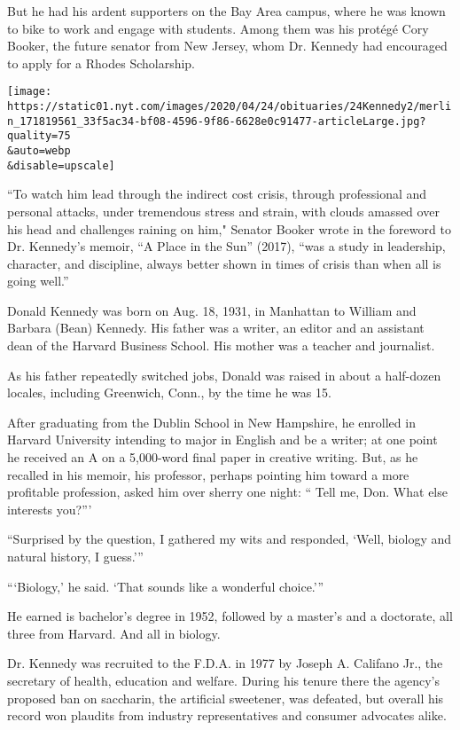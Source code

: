 But he had his ardent supporters on the Bay Area campus, where he was
known to bike to work and engage with students. Among them was his
protégé Cory Booker, the future senator from New Jersey, whom Dr.
Kennedy had encouraged to apply for a Rhodes Scholarship.

\texttt{[image: https://static01.nyt.com/images/2020/04/24/obituaries/24Kennedy2/merlin\_171819561\_33f5ac34-bf08-4596-9f86-6628e0c91477-articleLarge.jpg?quality=75\\\&auto=webp\\\&disable=upscale]}

``To watch him lead through the indirect cost crisis, through
professional and personal attacks, under tremendous stress and strain,
with clouds amassed over his head and challenges raining on him,"
Senator Booker wrote in the foreword to Dr. Kennedy's memoir, ``A Place
in the Sun'' (2017), ``was a study in leadership, character, and
discipline, always better shown in times of crisis than when all is
going well.''

Donald Kennedy was born on Aug. 18, 1931, in Manhattan to William and
Barbara (Bean) Kennedy. His father was a writer, an editor and an
assistant dean of the Harvard Business School. His mother was a teacher
and journalist.

As his father repeatedly switched jobs, Donald was raised in about a
half-dozen locales, including Greenwich, Conn., by the time he was 15.

After graduating from the Dublin School in New Hampshire, he enrolled in
Harvard University intending to major in English and be a writer; at one
point he received an A on a 5,000-word final paper in creative writing.
But, as he recalled in his memoir, his professor, perhaps pointing him
toward a more profitable profession, asked him over sherry one night: ``
Tell me, Don. What else interests you?'''

``Surprised by the question, I gathered my wits and responded, `Well,
biology and natural history, I guess.'''

```Biology,' he said. `That sounds like a wonderful choice.'''

He earned is bachelor's degree in 1952, followed by a master's and a
doctorate, all three from Harvard. And all in biology.

Dr. Kennedy was recruited to the F.D.A. in 1977 by Joseph A. Califano
Jr., the secretary of health, education and welfare. During his tenure
there the agency's proposed ban on saccharin, the artificial sweetener,
was defeated, but overall his record won plaudits from industry
representatives and consumer advocates alike.

